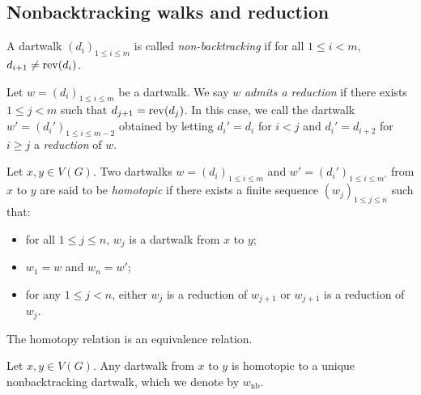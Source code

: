 \subsection{Nonbacktracking walks and reduction}

\begin{definition}
  \label{def:nonbacktracking}
  A dartwalk $(d_i)_{1 \leq i \leq m}$ is called \emph{non-backtracking} if
  for all $1 \leq i < m$, $d_{i+1} \neq \mathrm{rev} (d_{i})$.
\end{definition}

\begin{definition}
  \label{def:walk_reduction}
  Let $w = (d_i)_{1 \leq i \leq m}$ be a dartwalk.
  We say $w$ \emph{admits a reduction} if there exists $1 \leq j < m$ such that
  $d_{j+1} = \mathrm{rev}(d_j)$.
  In this case, we call the dartwalk $w'=(d_i')_{1 \leq i \leq m-2}$ obtained by
  letting $d_i'=d_i$ for $i<j$ and $d_i'=d_{i+2}$ for $i \geq j$ a \emph{reduction} of $w$.
\end{definition}

\begin{definition}
  \label{def:homotopy}
  Let $x, y \in V(G)$.
  Two dartwalks $w = (d_i)_{1 \leq i \leq m}$ and $w' = (d_i')_{1 \leq i \leq m'}$ from $x$ to $y$
  are said to be \emph{homotopic} if
  there exists a finite sequence $(w_j)_{1 \leq j \leq n}$ such that:
  \begin{itemize}
    \item for all $1 \leq j \leq n$, $w_j$ is a
    dartwalk from $x$ to $y$;
    \item $w_1=w$ and $w_n=w'$;
    \item for any $1 \leq j < n$, either $w_j$ is a reduction of $w_{j+1}$ or $w_{j+1}$ is a
    reduction of $w_j$.
  \end{itemize}
\end{definition}

\begin{proposition}
  \label{prop:homotopy_equivalence}
  The homotopy relation is an equivalence relation.
\end{proposition}

\begin{theorem}
  \label{thm:unique_nonbacktracking}
  Let $x, y \in V(G)$.
  Any dartwalk from $x$ to $y$ is homotopic to a unique nonbacktracking dartwalk, which we denote by
  $w_{\mathrm{nb}}$.
\end{theorem}


